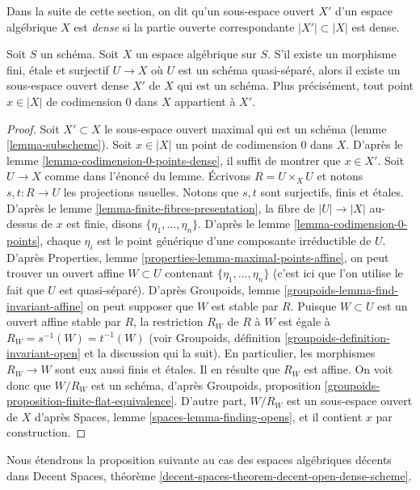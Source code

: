 \noindent
Dans la suite de cette section, on dit qu'un sous-espace ouvert
$X'$ d'un espace algébrique $X$ est {\it dense} si la partie ouverte
correspondante $|X'| \subset |X|$ est dense.

\begin{lemma}
\label{lemma-quasi-separated-finite-etale-cover-dense-open-scheme}
Soit $S$ un schéma. Soit $X$ un espace algébrique sur $S$.
S'il existe un morphisme fini, \'etale et surjectif
$U \to X$ où $U$ est un schéma quasi-séparé, alors
il existe un sous-espace ouvert dense $X'$ de $X$ qui est un schéma.
Plus précisément, tout point $x \in |X|$ de codimension $0$ dans $X$
appartient à $X'$.
\end{lemma}

\begin{proof}
Soit $X' \subset X$ le sous-espace ouvert maximal qui est un schéma
(lemme \ref{lemma-subscheme}).
Soit $x \in |X|$ un point de codimension $0$ dans $X$.
D'après le lemme \ref{lemma-codimension-0-points-dense},
il suffit de montrer que $x \in X'$.
Soit $U \to X$ comme dans l'énoncé du lemme.
Écrivons $R = U \times_X U$ et notons $s, t : R \to U$ les projections usuelles.
Notons que $s, t$ sont surjectifs, finis et \'etales.
D'après le lemme \ref{lemma-finite-fibres-presentation},
la fibre de $|U| \to |X|$ au-dessus de $x$ est finie, disons
$\{\eta_1, \ldots, \eta_n\}$. D'après le lemme \ref{lemma-codimension-0-points},
chaque $\eta_i$ est le point générique d'une composante irréductible de $U$.
D'après Properties, lemme \ref{properties-lemma-maximal-points-affine},
on peut trouver un ouvert affine $W \subset U$ contenant
$\{\eta_1, \ldots, \eta_n\}$
(c'est ici que l'on utilise le fait que $U$ est quasi-séparé). D'après
Groupoids, lemme \ref{groupoids-lemma-find-invariant-affine}
on peut supposer que $W$ est stable par $R$.
Puisque $W \subset U$ est un ouvert affine stable par $R$, la restriction
$R_W$ de $R$ à $W$ est égale à $R_W = s^{-1}(W) = t^{-1}(W)$ (voir
Groupoids, définition \ref{groupoids-definition-invariant-open}
et la discussion qui la suit). En particulier, les morphismes $R_W \to W$ sont
eux aussi finis et \'etales. Il en résulte que $R_W$ est affine.
On voit donc que $W/R_W$ est un schéma, d'après
Groupoids, proposition \ref{groupoids-proposition-finite-flat-equivalence}.
D'autre part, $W/R_W$ est un sous-espace ouvert de $X$ d'après
Spaces, lemme \ref{spaces-lemma-finding-opens}, et il contient
$x$ par construction.
\end{proof}

\noindent
Nous étendrons la proposition suivante au cas des
espaces algébriques décents dans
Decent Spaces, théorème
\ref{decent-spaces-theorem-decent-open-dense-scheme}.

